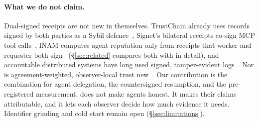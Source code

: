 \paragraph{What we do not claim.}
Dual-signed receipts are not new in themselves. TrustChain already uses
records signed by both parties as a Sybil defence~\cite{otte2020trustchain},
Signet's bilateral receipts co-sign MCP tool calls~\cite{signet},
INAM computes agent reputation only from receipts that worker and
requester both sign~\cite{inam} (\S\ref{sec:related} compares both with
\sys{} in detail), and
accountable distributed systems have long used signed, tamper-evident
logs~\cite{haeberlen2007peerreview}. Nor is agreement-weighted,
observer-local trust new~\cite{xiong2004peertrust,walsh2006credence}.
Our contribution is the combination for agent delegation, the countersigned
resumption, and the pre-registered measurement. \sys{} does not make agents honest.
It makes their claims attributable, and it lets each observer decide how
much evidence it needs. Identifier grinding and cold start remain open
(\S\ref{sec:limitations}).
